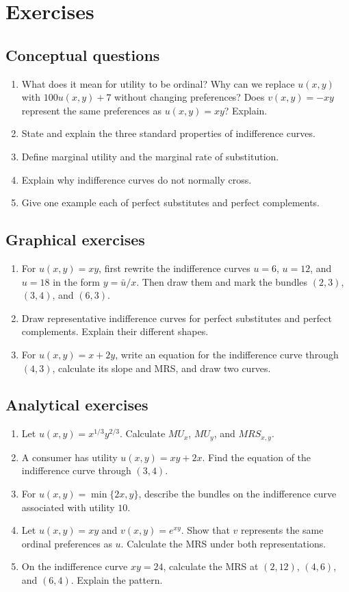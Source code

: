 \section*{Exercises}

\subsection*{Conceptual questions}
\begin{enumerate}[label=\arabic*.]
  \item What does it mean for utility to be ordinal? Why can we replace $u(x,y)$ with $100u(x,y)+7$ without changing preferences? Does $v(x,y)=-xy$ represent the same preferences as $u(x,y)=xy$? Explain.
  \item State and explain the three standard properties of indifference curves.
  \item Define marginal utility and the marginal rate of substitution.
  \item Explain why indifference curves do not normally cross.
  \item Give one example each of perfect substitutes and perfect complements.
\end{enumerate}

\subsection*{Graphical exercises}
\begin{enumerate}[resume,label=\arabic*.]
  \item For $u(x,y)=xy$, first rewrite the indifference curves $u=6$, $u=12$, and $u=18$ in the form $y=\bar{u}/x$. Then draw them and mark the bundles $(2,3)$, $(3,4)$, and $(6,3)$.
  \item Draw representative indifference curves for perfect substitutes and perfect complements. Explain their different shapes.
  \item For $u(x,y)=x+2y$, write an equation for the indifference curve through $(4,3)$, calculate its slope and MRS, and draw two curves.
\end{enumerate}

\subsection*{Analytical exercises}
\begin{enumerate}[resume,label=\arabic*.]
  \item Let $u(x,y)=x^{1/3}y^{2/3}$. Calculate $MU_x$, $MU_y$, and $MRS_{x,y}$.
  \item A consumer has utility $u(x,y)=xy+2x$. Find the equation of the indifference curve through $(3,4)$.
  \item For $u(x,y)=\min\{2x,y\}$, describe the bundles on the indifference curve associated with utility $10$.
  \item Let $u(x,y)=xy$ and $v(x,y)=e^{xy}$. Show that $v$ represents the same ordinal preferences as $u$. Calculate the MRS under both representations.
  \item On the indifference curve $xy=24$, calculate the MRS at $(2,12)$, $(4,6)$, and $(6,4)$. Explain the pattern.
\end{enumerate}

